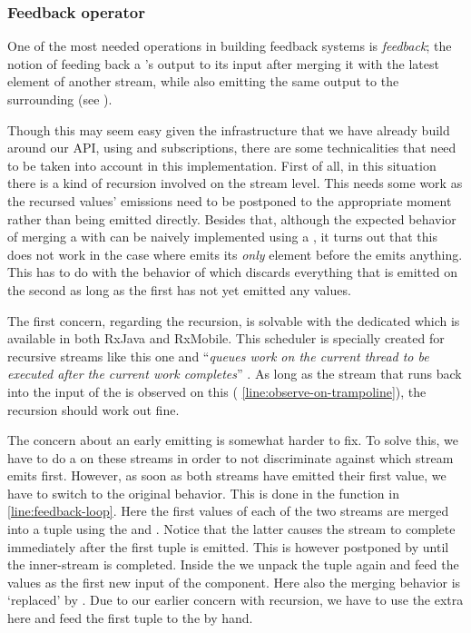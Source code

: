 \subsubsection{Feedback operator}
One of the most needed operations in building feedback systems is \textit{feedback}; the notion of feeding back a \comp's output to its input after merging it with the latest element of another stream, while also emitting the same output to the surrounding \comp (see ).

Though this may seem easy given the infrastructure that we have already build around our API, using  and subscriptions, there are some technicalities that need to be taken into account in this implementation. First of all, in this situation there is a kind of recursion involved on the stream level. This needs some work as the recursed values' emissions need to be postponed to the appropriate moment rather than being emitted directly. Besides that, although the expected behavior of merging a \comp with  can be naively implemented using a , it turns out that this does not work in the case where  emits its \emph{only} element before the \comp emits anything. This has to do with the behavior of  which discards everything that is emitted on the second \obs as long as the first \obs has not yet emitted any values.

The first concern, regarding the recursion, is solvable with the dedicated  which is available in both RxJava and RxMobile. This scheduler is specially created for recursive streams like this one and ``\textit{queues work on the current thread to be executed after the current work completes}'' \cite{RxJava-Trampoline-Scheduler}. As long as the stream that runs back into the input of the \comp is observed on this \sch ( \cref{line:observe-on-trampoline}), the recursion should work out fine.

The concern about an early emitting  is somewhat harder to fix. To solve this, we have to do a  on these streams in order to not discriminate against which stream emits first. However, as soon as both streams have emitted their first value, we have to switch to the original  behavior. This is done in the function  in  \cref{line:feedback-loop}. Here the first values of each of the two streams are merged into a tuple using the  and . Notice that the latter causes the stream to complete immediately after the first tuple is emitted. This  is however postponed by  until the inner-stream is completed. Inside the  we unpack the tuple again and feed the values as the first new input of the  component. Here also the merging behavior is `replaced' by . Due to our earlier concern with recursion, we have to use the extra  here and feed the first tuple to the  by hand.

